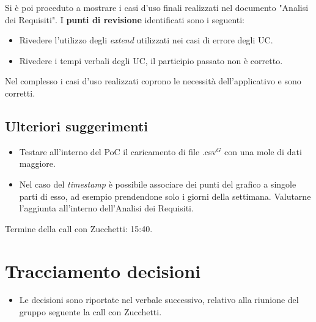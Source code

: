 \noindent
Si è poi proceduto a mostrare i casi d'uso finali realizzati nel documento "Analisi dei Requisiti".
I \textbf{punti di revisione} identificati sono i seguenti:
\begin{itemize}
	\item Rivedere l'utilizzo degli \textit{extend} utilizzati nei casi di errore degli UC.
	\item Rivedere i tempi verbali degli UC, il participio passato non è corretto.
\end{itemize}
Nel complesso i casi d'uso realizzati coprono le necessità dell'applicativo e sono corretti.

\subsection{Ulteriori suggerimenti}
\begin{itemize}
	\item Testare all'interno del PoC il caricamento di file .csv$^{G}$ con una mole di dati maggiore.
	\item Nel caso del \textit{timestamp} è possibile associare dei punti del grafico a singole parti di esso, ad esempio prendendone solo i giorni della settimana. Valutarne l'aggiunta all'interno dell'Analisi dei Requisiti.
\end{itemize}

\noindent Termine della call con Zucchetti: 15:40.



\section{Tracciamento decisioni}
\begin{itemize}
	\item Le decisioni sono riportate nel verbale successivo, relativo alla riunione del gruppo seguente la call con Zucchetti. 
\end{itemize}
